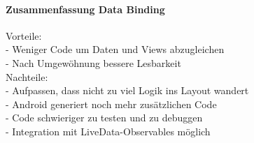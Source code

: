 \paragraph{Zusammenfassung Data Binding}
Vorteile: \\
- Weniger Code um Daten und Views abzugleichen \\
- Nach Umgewöhnung bessere Lesbarkeit \\
Nachteile: \\
- Aufpassen, dass nicht zu viel Logik ins Layout wandert \\
- Android generiert noch mehr zusätzlichen Code \\
- Code schwieriger zu testen und zu debuggen \\
- Integration mit LiveData-Observables möglich \\








